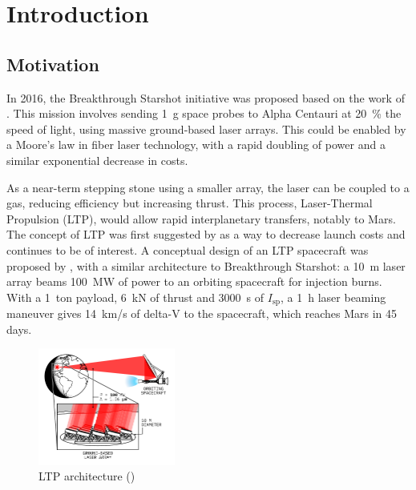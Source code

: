 \chapter{Introduction} \label{chp:intro}
    
    \section{Motivation}

        In 2016, the Breakthrough Starshot initiative was proposed based on the work of \textcite{lubinRoadmapInterstellarFlight2016}. This mission involves sending \qty{1}{g} space probes to Alpha Centauri at \qty{20}{\%} the speed of light, using massive ground-based laser arrays. This could be enabled by a Moore's law in fiber laser technology, with a rapid doubling of power and a similar exponential decrease in costs. 
        
        As a near-term stepping stone using a smaller array, the laser can be coupled to a gas, reducing efficiency but increasing thrust. This process, Laser-Thermal Propulsion (LTP), would allow rapid interplanetary transfers, notably to Mars. The concept of LTP was first suggested by \textcite{kantrowitzRelevanceSpace1971} as a way to decrease launch costs and continues to be of interest. A conceptual design of an LTP spacecraft was proposed by \textcite{duplayDesignRapidTransit2022a}, with a similar architecture to Breakthrough Starshot: a \qty{10}{m} laser array beams \qty{100}{MW} of power to an orbiting spacecraft for injection burns. With a \qty{1}{ton} payload, \qty{6}{kN} of thrust and \qty{3000}{s} of $I_\mathrm{sp}$, a \qty{1}{h} laser beaming maneuver gives \qty{14}{km/s} of delta-V to the spacecraft, which reaches Mars in 45 days.

        \begin{figure}[!ht]
            \centering
            \includegraphics[width=0.4\textwidth]{assets/2 background/ltp_architecture.pdf}
            \caption{LTP architecture (\textcite{duplayArgonLaserPlasmaThruster2024a})}
            \label{fig:LTP architecture}
        \end{figure}

